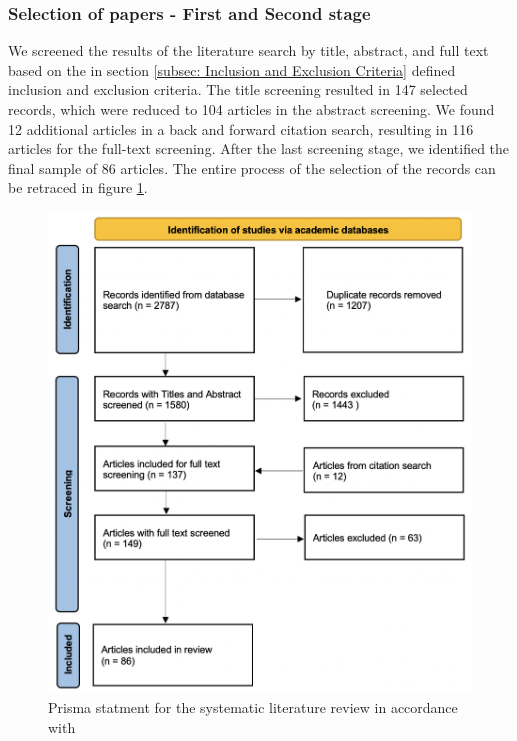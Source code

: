 \subsubsection{Selection of papers - First and Second stage}

We screened the results of the literature search by title, abstract, and full text based on the in section \ref{subsec: Inclusion and Exclusion Criteria} defined inclusion and exclusion criteria. The title screening resulted in 147 selected records, which were reduced to 104 articles in the abstract screening. We found 12 additional articles in a back and forward citation search, resulting in 116 articles for the full-text screening. After the last screening stage, we identified the final sample of 86 articles. The entire process of the selection of the records can be retraced in figure \ref{fig: Prisma Statement}.

\begin{figure}
    \centering
    \includegraphics[width=\textwidth]{reports/figures/prisma_statement.png}
    \caption{Prisma statment for the systematic literature review in accordance with \cite{page_prisma_2021}}
    \label{fig: Prisma Statement}
\end{figure}

